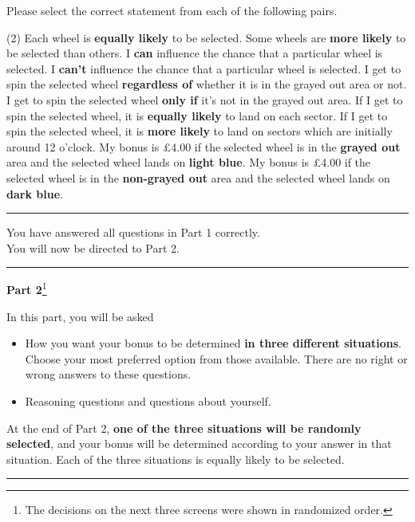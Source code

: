 \noindent Please select the correct statement from each of the following pairs.

\begin{tasks}[style=itemize](2)
\task Each wheel is \textbf{equally likely} to be selected.
\task Some wheels are \textbf{more likely} to be selected than others.
\task I \textbf{can} influence the chance that a particular wheel is selected.
\task I \textbf{can't} influence the chance that a particular wheel is selected. 
\task I get to spin the selected wheel \textbf{regardless of} whether it is in the grayed out area or not.
\task I get to spin the selected wheel \textbf{only if} it's not in the grayed out area.
\task If I get to spin the selected wheel, it is \textbf{equally likely} to land on each sector.
\task If I get to spin the selected wheel, it is \textbf{more likely} to land on sectors which are initially around 12 o'clock. 
\task My bonus is £4.00 if the selected wheel is in the \textbf{grayed out} area and the selected wheel lands on \textbf{light blue}.
\task My bonus is £4.00 if the selected wheel is in the \textbf{non-grayed out} area and the selected wheel lands on \textbf{dark blue}.
\end{tasks}

\bigskip
\noindent \rule{\linewidth}{0.4pt}

\noindent You have answered all questions in Part 1 correctly. \\
You will now be directed to Part 2.

\bigskip
\noindent \rule{\linewidth}{0.4pt}

\noindent \textbf{Part 2}\footnote{
The decisions on the next three screens were shown in randomized order.
}

\noindent In this part, you will be asked 
\begin{itemize}
\item How you want your bonus to be determined \textbf{in three different situations}.
Choose your most preferred option from those available.
There are no right or wrong answers to these questions.
\item Reasoning questions and questions about yourself.
\end{itemize}

\noindent At the end of Part 2, \textbf{one of the three situations will be randomly selected}, and your bonus will be determined according to your answer in that situation.
Each of the three situations is equally likely to be selected.

\noindent \rule{\linewidth}{0.4pt}

